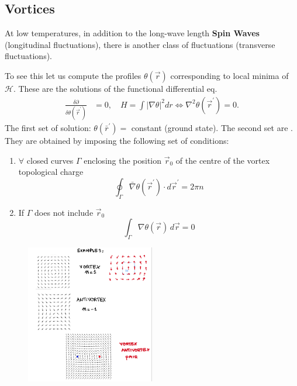 \documentclass[../../Main/Main.tex]{subfiles}
\begin{document}
\subsection{Vortices}

At low temperatures, in addition to the long-wave length \textbf{Spin Waves} (longitudinal fluctuations), there is another class of fluctuations (transverse fluctuations).

To see this let us compute the profiles $\theta(\vec{r})$ corresponding to local minima of $\mathcal{H}$. These are the solutions of the functional differential eq.
$$\begin{aligned}
\frac{\delta \partial}{\delta \theta\left(\vec{r}^{\prime}\right)} & =0, \quad H=\int|\nabla \theta|^2 d r   \Leftrightarrow \nabla^2 \theta\left(\vec{r}^{\prime}\right)=0 .
\end{aligned}$$
The first set of solution: $\theta\left(\bar{r}^{\prime}\right)=$ constant (ground state).
The second set are . They are obtained by imposing the following set of conditions:

\begin{enumerate}[label=(\alph*)]
    \item $\forall$ closed curves $\Gamma$ enclosing the position $\vec{r}_0$ of the centre of the vortex topological charge $$\oint_{\Gamma} \bar{\nabla} \theta\left(\vec{r}^{\prime}\right) \cdot d \vec{r}^{\prime}=2 \pi n$$
    \item If $\Gamma$ does not include $\vec{r}_{0}$ $$\int _{\Gamma}\nabla \theta(\vec{r}) \, d\vec{r} = 0$$
\end{enumerate}

\begin{figure}[h!]
\centering
\includegraphics[width=0.5\textwidth]{./img/IMG2.png}
\end{figure}
\end{document}
